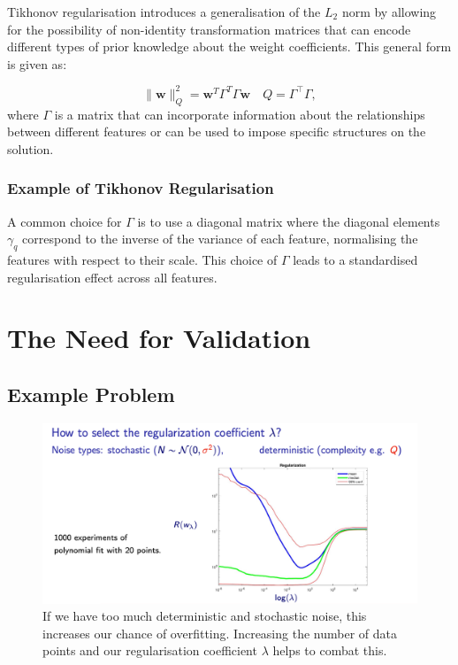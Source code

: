 Tikhonov regularisation introduces a generalisation of the \( L_2 \) norm by allowing for the possibility of non-identity transformation matrices that can encode different types of prior knowledge about the weight coefficients. This general form is given as:



\begin{equation}
\|\mathbf{w}\|_{Q}^2 = \mathbf{w}^T\Gamma^T\Gamma\mathbf{w} \quad Q = \Gamma^\top\Gamma,
\end{equation}
where \( \Gamma \) is a matrix that can incorporate information about the relationships between different features or can be used to impose specific structures on the solution.

\subsubsection*{Example of Tikhonov Regularisation}
A common choice for \( \Gamma \) is to use a diagonal matrix where the diagonal elements \( \gamma_q \) correspond to the inverse of the variance of each feature, normalising the features with respect to their scale. This choice of \( \Gamma \) leads to a standardised regularisation effect across all features.




\section{The Need for Validation}
\subsection*{Example Problem}
\begin{figure}[H]
    \centering\includegraphics[width=0.75\linewidth]{img/choose_lambda.png}
    \caption{If we have too much deterministic and stochastic noise, this increases our chance of overfitting. Increasing the number of data points and our regularisation coefficient $\lambda$ helps to combat this.}
    \label{fig:enter-label}
\end{figure}

